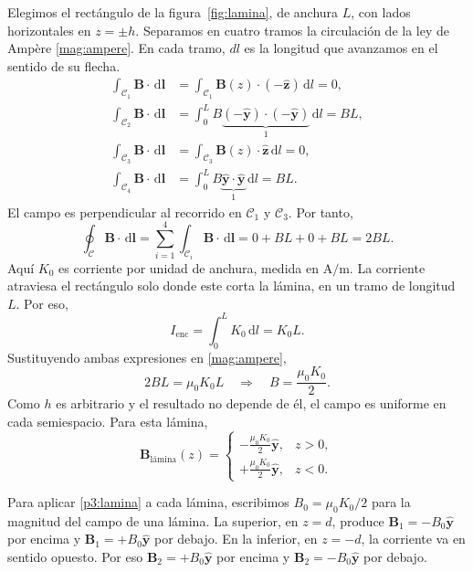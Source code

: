\documentclass[11pt]{article}
\newcommand{\dd}{\,\mathrm{d}}
\newcommand{\ey}{\hat{\mathbf{y}}}
\newcommand{\ez}{\hat{\mathbf{z}}}
\begin{document}
Elegimos el rectángulo de la figura~\ref{fig:lamina}, de anchura
$L$, con lados horizontales en $z=\pm h$. Separamos en cuatro tramos
la circulación de la ley de Ampère \eqref{mag:ampere}. En cada tramo,
$dl$ es la longitud que avanzamos en el sentido de su flecha.
\begin{align*}
  \int_{\mathcal C_1}\mathbf B\cdot\dd\mathbf l
    &=\int_{\mathcal C_1}\mathbf B(z)\cdot(-\ez)\dd l=0,\\
  \int_{\mathcal C_2}\mathbf B\cdot\dd\mathbf l
    &=\int_0^L B\underbrace{(-\ey)\cdot(-\ey)}_{1}\dd l=BL,\\
  \int_{\mathcal C_3}\mathbf B\cdot\dd\mathbf l
    &=\int_{\mathcal C_3}\mathbf B(z)\cdot\ez\dd l=0,\\
  \int_{\mathcal C_4}\mathbf B\cdot\dd\mathbf l
    &=\int_0^L B\underbrace{\ey\cdot\ey}_{1}\dd l=BL .
\end{align*}
El campo es perpendicular al recorrido en $\mathcal C_1$ y
$\mathcal C_3$. Por tanto,
\[
  \oint_{\mathcal C}\mathbf B\cdot\dd\mathbf l
  =\sum_{i=1}^{4}\int_{\mathcal C_i}\mathbf B\cdot\dd\mathbf l
  =0+BL+0+BL=2BL .
\]
Aquí $K_0$ es corriente por unidad de anchura, medida en $\mathrm{A/m}$.
La corriente atraviesa el rectángulo solo donde este corta la lámina,
en un tramo de longitud $L$. Por eso,
\[
  I_{\mathrm{enc}}=\int_0^L K_0\dd l=K_0L.
\]
Sustituyendo ambas expresiones en \eqref{mag:ampere},
\[
  2BL=\mu_0K_0L
  \quad\Longrightarrow\quad
  B=\frac{\mu_0K_0}{2}.
\]
Como $h$ es arbitrario y el resultado no depende de él,
el campo es uniforme en cada semiespacio. Para esta lámina,
\begin{equation}
  \mathbf B_{\text{lámina}}(z)=
  \begin{cases}
    \displaystyle-\frac{\mu_0K_0}{2}\ey,&z>0,\\[5pt]
    \displaystyle+\frac{\mu_0K_0}{2}\ey,&z<0.
  \end{cases}
  \label{p3:lamina}
\end{equation}

Para aplicar \eqref{p3:lamina} a cada lámina, escribimos
$B_0=\mu_0K_0/2$ para la magnitud del campo de una lámina.
La superior, en $z=d$, produce $\mathbf B_1=-B_0\ey$ por
encima y $\mathbf B_1=+B_0\ey$ por debajo. En la inferior,
en $z=-d$, la corriente va en sentido opuesto. Por eso
$\mathbf B_2=+B_0\ey$ por encima y $\mathbf B_2=-B_0\ey$
por debajo.
\end{document}
